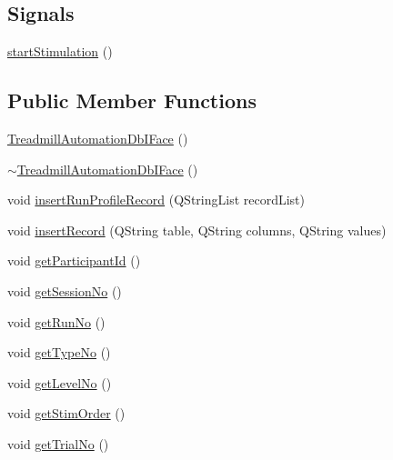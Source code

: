 \subsection*{Signals}
\begin{DoxyCompactItemize}
\item 
\hyperlink{class_treadmill_automation_db_i_face_ac0f0625e2e78c69900ea4a4719b52f65}{start\+Stimulation} ()
\end{DoxyCompactItemize}
\subsection*{Public Member Functions}
\begin{DoxyCompactItemize}
\item 
\hyperlink{class_treadmill_automation_db_i_face_ad752e9bab06a145e8f18238fc469ed84}{Treadmill\+Automation\+Db\+I\+Face} ()
\item 
\hyperlink{class_treadmill_automation_db_i_face_a87edeb446811d4815c129e0358d74ebe}{$\sim$\+Treadmill\+Automation\+Db\+I\+Face} ()
\item 
void \hyperlink{class_treadmill_automation_db_i_face_a2810ac6e2cb938a04c66f64d83c90d5f}{insert\+Run\+Profile\+Record} (Q\+String\+List record\+List)
\item 
void \hyperlink{class_treadmill_automation_db_i_face_a436c4be2c578db9455bfbcff484c9eb9}{insert\+Record} (Q\+String table, Q\+String columns, Q\+String values)
\item 
void \hyperlink{class_treadmill_automation_db_i_face_aa15c26329baad5935896f9d352f96082}{get\+Participant\+Id} ()
\item 
void \hyperlink{class_treadmill_automation_db_i_face_a1d66f0701714497573999fabf6a31e80}{get\+Session\+No} ()
\item 
void \hyperlink{class_treadmill_automation_db_i_face_a62dc0aa5094a1fe4a638f63870db952d}{get\+Run\+No} ()
\item 
void \hyperlink{class_treadmill_automation_db_i_face_a1f463b6be4cdd09d55df207572407822}{get\+Type\+No} ()
\item 
void \hyperlink{class_treadmill_automation_db_i_face_a50b00503be3596bd8db68d51ef2ae9b1}{get\+Level\+No} ()
\item 
void \hyperlink{class_treadmill_automation_db_i_face_a9d15e9f80ec5eb6e332264cf72cfb170}{get\+Stim\+Order} ()
\item 
void \hyperlink{class_treadmill_automation_db_i_face_aebab4cc02e56ef36085545b20ac3c021}{get\+Trial\+No} ()
\item 

\end{DoxyCompactItemize}

